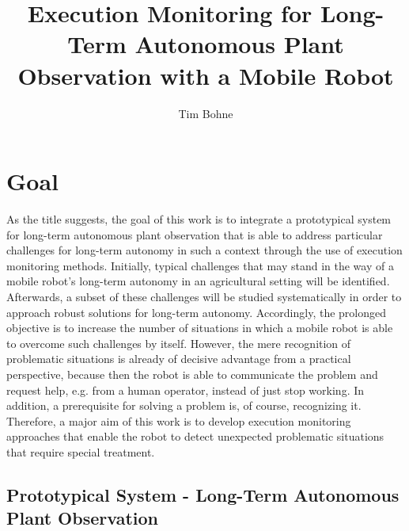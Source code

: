 \documentclass[english, master, expose, utf8]{base/thesis_KBS}
\begin{document}
\title{Execution Monitoring for Long-Term Autonomous Plant Observation with a Mobile Robot}
\author{Tim Bohne}

\generatetitle

\section{Goal}

As the title suggests, the goal of this work is to integrate a prototypical system for long-term autonomous plant observation that is able to address 
particular challenges for long-term autonomy in such a context through the use of execution monitoring methods. Initially, typical challenges that may stand in the way of a mobile
robot's long-term autonomy in an agricultural setting will be identified. Afterwards, a subset of these challenges will be studied systematically in order to 
approach robust solutions for long-term autonomy. Accordingly, the prolonged objective is to increase the number of situations in which a mobile robot is able to 
overcome such challenges by itself. However, the mere recognition of problematic situations is already of decisive advantage from a practical perspective, 
because then the robot is able to communicate the problem and request help, e.g. from a human operator, instead of just stop working. In addition, 
a prerequisite for solving a problem is, of course, recognizing it. Therefore, a major aim of this work is to develop execution monitoring approaches 
that enable the robot to detect unexpected problematic situations that require special treatment.

\subsection{Prototypical System - Long-Term Autonomous Plant Observation}
\label{sec:prototypical_system}
\end{document}
